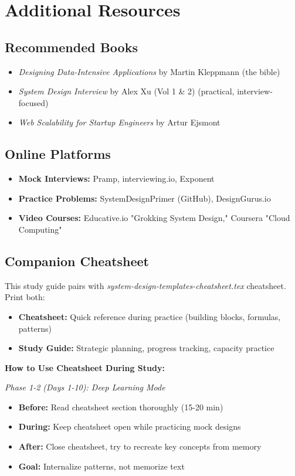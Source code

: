 \documentclass[10pt]{article}
\begin{document}
\section{Additional Resources}

\subsection{Recommended Books}
\begin{itemize}
\item \textit{Designing Data-Intensive Applications} by Martin Kleppmann (the bible)
\item \textit{System Design Interview} by Alex Xu (Vol 1 \& 2) (practical, interview-focused)
\item \textit{Web Scalability for Startup Engineers} by Artur Ejsmont
\end{itemize}

\subsection{Online Platforms}
\begin{itemize}
\item \textbf{Mock Interviews:} Pramp, interviewing.io, Exponent
\item \textbf{Practice Problems:} SystemDesignPrimer (GitHub), DesignGurus.io
\item \textbf{Video Courses:} Educative.io "Grokking System Design," Coursera "Cloud Computing"
\end{itemize}

\subsection{Companion Cheatsheet}

This study guide pairs with \textit{system-design-templates-cheatsheet.tex} cheatsheet. Print both:
\begin{itemize}
\item \textbf{Cheatsheet:} Quick reference during practice (building blocks, formulas, patterns)
\item \textbf{Study Guide:} Strategic planning, progress tracking, capacity practice
\end{itemize}

\textbf{How to Use Cheatsheet During Study:}

\textit{Phase 1-2 (Days 1-10): Deep Learning Mode}
\begin{itemize}
\item \textbf{Before:} Read cheatsheet section thoroughly (15-20 min)
\item \textbf{During:} Keep cheatsheet open while practicing mock designs
\item \textbf{After:} Close cheatsheet, try to recreate key concepts from memory
\item \textbf{Goal:} Internalize patterns, not memorize text
\end{itemize}
\end{document}
